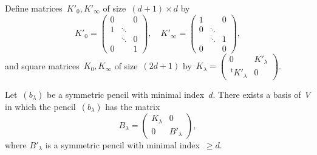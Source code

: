 \documentclass{lms}%
\def\transpose{\,{}^{\mathrm{t}\!}}
\def\mat#1{\begin{pmatrix}#1\end{pmatrix}}
\begin{document}
Define matrices~$K'_0, K'_{∞}$ of size~$(d+1)×d$ by
\begin{equation}\label{eq:def-K}
K'_0 = \mat{0&&0\\1&⋱&\\&⋱&0\\0&&1}, \quad
K'_{∞} = \mat{1&&0\\0&⋱&\\&⋱&1\\0&&0},
\end{equation}
and square matrices~$K_{0}, K_{∞}$ of size~$(2d+1)$ by~$K_{λ} = 
\mat{0&K'_{λ}\\\transpose{K'_{λ}}&0}$.

\begin{prop}\label{prop:kronecker-1block}
Let~$(b_{λ})$ be a symmetric pencil with minimal index~$d$. There exists
a basis of~$V$ in which the pencil~$(b_{λ})$ has the matrix 
\[ B_{λ} = \mat{K_λ&0\\0&B'_{λ}}, \]
where $B'_{λ}$ is a symmetric pencil with minimal index~$≥ d$.
\end{prop}
\end{document}
